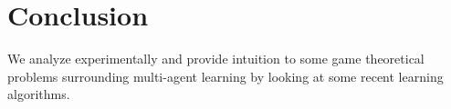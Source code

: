 \documentclass{article}
\begin{document}
\section{Conclusion}
We analyze experimentally and provide intuition to some game theoretical problems surrounding multi-agent learning by looking at some recent learning algorithms.









%
%
%
%
%
%
%
%
%
\end{document}
